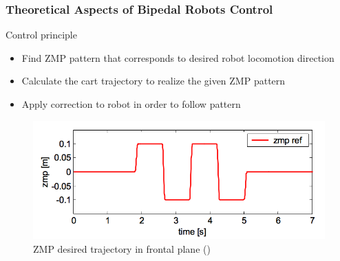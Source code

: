\documentclass{beamer}
\begin{document}
	\begin{frame}
		\frametitle{Theoretical Aspects of Bipedal Robots Control}
		\begin{block}{Control principle}
			\begin{itemize}
				\item
				Find ZMP pattern that corresponds to desired robot locomotion direction
				\item
				Calculate the cart trajectory to realize the given ZMP pattern
				\item
				Apply correction to robot in order to follow pattern
			\end{itemize}
		\end{block}
		
		\begin{figure}[h!]
			\begin{minipage}[H]{\linewidth}
				\centering
				\includegraphics[width=0.85\linewidth]{presentation_images/13}
				\caption{ZMP desired trajectory in frontal plane (\cite{kajita2003biped})}
			\end{minipage}
		\end{figure}
	\end{frame}
	
\end{document}
